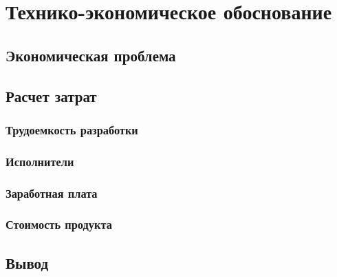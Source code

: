 \newpage
\section{Технико-экономическое обоснование}
    \subsection{Экономическая проблема}
    \subsection{Расчет затрат}
        \subsubsection{Трудоемкость разработки}
        \subsubsection{Исполнители}
        \subsubsection{Заработная плата}
        \subsubsection{Стоимость продукта}
    \subsection{Вывод}
